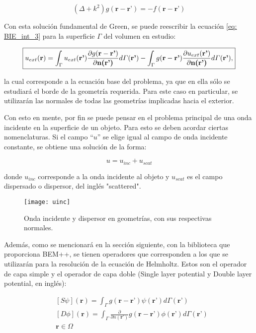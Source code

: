 \documentclass[12pt,letterpaper]{article}
\numberwithin{equation}{section}
\begin{document}
\begin{equation}
(\Delta+k^2)g(\textbf{r}-\textbf{r'})=-f(\textbf{r}-\textbf{r'})
\label{eq:Helmholtz green}
\end{equation}

Con esta solución fundamental de Green, se puede reescribir la ecuación \ref{eq: BIE_int_3} para la superficie $\Gamma$ del volumen en estudio:

\begin{equation}
\boxed{
	u_{ext}(\textbf{r})=\int_{\Gamma}u_{ext}(\textbf{r'})\frac{\partial g(\textbf{r}-\textbf{r'})}{\partial\textbf{n(\textbf{r'})}}d\varGamma(\textbf{r'}) - \int_{\Gamma}g(\textbf{r}-\textbf{r'})\frac{\partial u_{ext}(\textbf{r'})}{\partial\textbf{n(\textbf{r'})}}d\varGamma(\textbf{r'}),
	\label{eq: BIE_ext}
}	
\end{equation}

\noindent la cual corresponde a la ecuación base del problema, ya que en ella sólo se estudiará el borde de la geometría requerida. Para este caso en particular, se utilizarán las normales de todas las geometrías implicadas hacia el exterior. 

Con esto en mente, por fin se puede pensar en el problema principal de una onda incidente en la superficie de un objeto. Para esto se deben acordar ciertas nomenclaturas. Si el campo ``$u$'' se elige igual al campo de onda incidente constante, se obtiene una solución de la forma:

\begin{equation}
	u = u_{inc} + u_{scat}
	\label{u}
\end{equation} 

\noindent donde $u_{inc}$ corresponde a la onda incidente al objeto y $u_{scat}$ es el campo dispersado o dispersor, del inglés "scattered".

\begin{figure}[H]
	\centering
	\texttt{[image: uinc]}
	\caption{Onda incidente y dispersor en geometrías, con sus respectivas normales. }
\end{figure}

Además, como se mencionará en la sección siguiente, con la biblioteca que proporciona BEM++, se tienen operadores que corresponden a los que se utilizarán para la resolución de la ecuación de Helmholtz. Estos son el operador de capa simple y el operador de capa doble (Single layer potential y Double layer potential, en inglés):


\begin{equation}
\begin{split}
&[S\psi](\textbf{r})=\int_{\Gamma}g(\textbf{r}-\textbf{r'})\psi(\textbf{r'}) d\varGamma(\textbf{r'})\\
&[D\phi](\textbf{r})=\int_{\Gamma}\frac{\partial}{\partial n(\textbf{r'})} g(\textbf{r}-\textbf{r'})\phi(\textbf{r'}) d\varGamma(\textbf{r'})\\  
&\textbf{r}\in\Omega\\
\end{split}
\label{ecuacionoperadores}
\end{equation}
\end{document}
